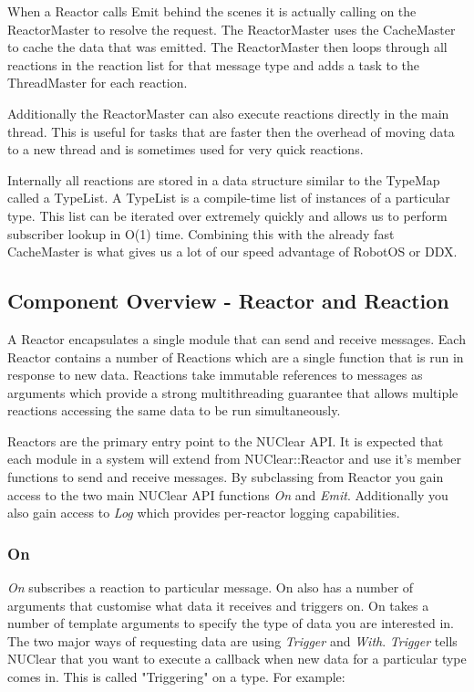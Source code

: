 \documentclass[english,12pt]{scrartcl}
\begin{document}
				When a Reactor calls Emit behind the scenes it is actually calling on the ReactorMaster to resolve the request.
				The ReactorMaster uses the CacheMaster to cache the data that was emitted.
				The ReactorMaster then loops through all reactions in the reaction list for that message type and adds a task to the ThreadMaster for each reaction.

				Additionally the ReactorMaster can also execute reactions directly in the main thread.
				This is useful for tasks that are faster then the overhead of moving data to a new thread and is sometimes used for very quick reactions.

				Internally all reactions are stored in a data structure similar to the TypeMap called a TypeList.
				A TypeList is a compile-time list of instances of a particular type. This list can be iterated over extremely quickly and allows us to perform subscriber lookup in O(1) time.
				Combining this with the already fast CacheMaster is what gives us a lot of our speed advantage of RobotOS or DDX.

		\subsection{Component Overview - Reactor and Reaction}
			A Reactor encapsulates a single module that can send and receive messages.
			Each Reactor contains a number of Reactions which are a single function that is run in response to new data.
			Reactions take immutable references to messages as arguments which provide a strong multithreading guarantee that allows multiple reactions accessing the same data to be run simultaneously.

			Reactors are the primary entry point to the NUClear API.
			It is expected that each module in a system will extend from NUClear::Reactor and use it's member functions to send and receive messages.
			By subclassing from Reactor you gain access to the two main NUClear API functions \emph{On} and \emph{Emit}.
			Additionally you also gain access to \emph{Log} which provides per-reactor logging capabilities.

			\subsubsection{On}
				\emph{On} subscribes a reaction to particular message.
				On also has a number of arguments that customise what data it receives and triggers on.
				On takes a number of template arguments to specify the type of data you are interested in.
				The two major ways of requesting data are using \emph{Trigger} and \emph{With}.
				\emph{Trigger} tells NUClear that you want to execute a callback when new data for a particular type comes in.
				This is called "Triggering" on a type.
				For example:
\end{document}
